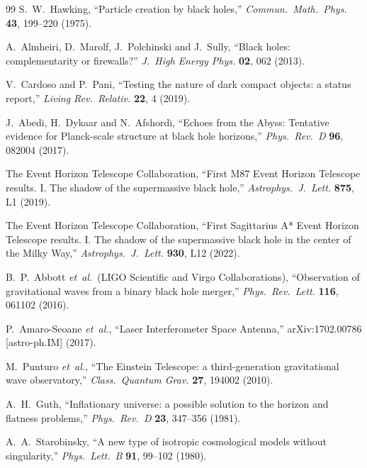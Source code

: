 \documentclass[a4paper]{article}
\begin{document}
\begin{thebibliography}{99}
S.~W.~Hawking,
``Particle creation by black holes,''
\textit{Commun.\ Math.\ Phys.} \textbf{43}, 199--220 (1975).

A.~Almheiri, D.~Marolf, J.~Polchinski and J.~Sully,
``Black holes: complementarity or firewalls?''
\textit{J.\ High Energy Phys.} \textbf{02}, 062 (2013).

V.~Cardoso and P.~Pani,
``Testing the nature of dark compact objects: a status report,''
\textit{Living Rev.\ Relativ.} \textbf{22}, 4 (2019).

J.~Abedi, H.~Dykaar and N.~Afshordi,
``Echoes from the Abyss: Tentative evidence for Planck-scale structure at black hole horizons,''
\textit{Phys.\ Rev.\ D} \textbf{96}, 082004 (2017).

The Event Horizon Telescope Collaboration,
``First M87 Event Horizon Telescope results. I. The shadow of the supermassive black hole,''
\textit{Astrophys.\ J.\ Lett.} \textbf{875}, L1 (2019).

The Event Horizon Telescope Collaboration,
``First Sagittarius A* Event Horizon Telescope results. I. The shadow of the supermassive black hole in the center of the Milky Way,''
\textit{Astrophys.\ J.\ Lett.} \textbf{930}, L12 (2022).

B.~P.~Abbott \textit{et~al.}\ (LIGO Scientific and Virgo Collaborations),
``Observation of gravitational waves from a binary black hole merger,''
\textit{Phys.\ Rev.\ Lett.} \textbf{116}, 061102 (2016).

P.~Amaro-Seoane \textit{et~al.},
``Laser Interferometer Space Antenna,''
arXiv:1702.00786 [astro-ph.IM] (2017).

M.~Punturo \textit{et~al.},
``The Einstein Telescope: a third-generation gravitational wave observatory,''
\textit{Class.\ Quantum Grav.} \textbf{27}, 194002 (2010).

A.~H.~Guth,
``Inflationary universe: a possible solution to the horizon and flatness problems,''
\textit{Phys.\ Rev.\ D} \textbf{23}, 347--356 (1981).

A.~A.~Starobinsky,
``A new type of isotropic cosmological models without singularity,''
\textit{Phys.\ Lett.\ B} \textbf{91}, 99--102 (1980).


\end{thebibliography}
\end{document}
